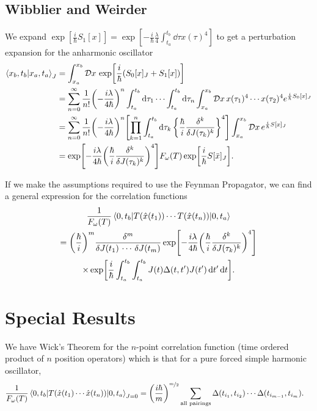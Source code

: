 \documentclass[]{revision-notes}
\begin{document}
\subsection{Wibblier and Weirder}
We expand \(\exp[\frac{i}{\hbar} S_1[x]] = \exp[-\frac{i}{\hbar} \frac{ \lambda }{4}\int_{t_a}^{t_b} \dd{\tau} x(\tau)^4]\) to get a perturbation expansion for the anharmonic oscillator
\begin{align*}
  \braket{x_b, t_b}{x_a, t_a}_J &= \int_{x_a}^{x_b} \DD{x} \exp[\frac{i}{\hbar}(S_0[x]_J + S_1[x])]\\
  &= \sum_{n=0}^{\infty} \frac{1}{n!} \qty(-\frac{i\lambda}{4\hbar})^n \int_{t_a}^{t_b} \dd{\tau_1} \cdots \int_{t_a}^{t_b} \dd{\tau_n}  \int_{x_a}^{x_b} \DD{x} x(\tau_1)^4 \cdots x(\tau_2)^4 e^{\frac{i}{\hbar} S_0[x]_J} \\
  &= \sum_{n=0}^{\infty} \frac{1}{n!} \qty(-\frac{i\lambda}{4\hbar})^n \qty[\prod_{k=1}^n \int_{t_a}^{t_b} \dd{\tau_k} \qty{\frac{\hbar}{i}\fdv[k]{J(\tau_k)}}^4] \int_{x_a}^{x_b} \DD{x}  e^{\frac{i}{\hbar} S[x]_J}\\
  &= \exp[-\frac{i\lambda}{4\hbar} \qty(\frac{\hbar}{i}\fdv[k]{J(\tau_k)})^4] F_\omega(T) \exp[\frac{i}{\hbar} S[\bar{x}]_J].
\end{align*}

If we make the assumptions required to use the Feynman Propagator, we can find a general expression for the correlation functions
\begin{multline*}
  \frac{1}{F_\omega(T)} \mel{0, t_b}{T(\hat{x}(t_1)) \cdots T(\hat{x}(t_n))}{0, t_a} \\= \qty(\frac{\hbar}{i})^m \frac{\delta^m}{\delta J(t_1)\,\cdots\,\delta J(t_m)} \exp[-\frac{i\lambda}{4\hbar} \qty(\frac{\hbar}{i}\fdv[k]{J(\tau_k)})^4]\\\times \exp[\frac{i}{\hbar} \int_{t_a}^{t_b}\int_{t_a}^{t_b}J(t)\Delta(t, t^\prime)J(t^\prime)\dd{t^\prime}\dd{t}].
\end{multline*}

\section{Special Results}
We have Wick's Theorem for the \( n\)-point correlation function (time ordered product of \(n\) position operators) which is that for a pure forced simple harmonic oscillator,
\begin{align*}
  \frac{1}{F_\omega (T)} \mel{0, t_b}{T(\hat{x}(t_1) \cdots \hat{x}(t_n))}{0, t_a}_{J=0} &= \qty(\frac{i\hbar}{m})^{\nicefrac{m}{2}} \sum_{\text{all pairings}}\Delta(t_{i_1}, t_{i_2})\cdots \Delta(t_{i_{m-1}}, t_{i_m}).
\end{align*}
\end{document}
